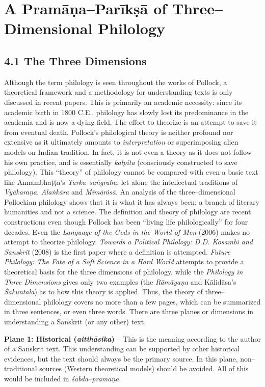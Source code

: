 
\chapter{A Pramāṇa–Parīkṣā of Three–Dimensional Philology}\label{chapter4}

\section*{4.1 The Three Dimensions}

Although the term philology is seen throughout the works of Pollock, a theoretical framework and a methodology for understanding texts is only discussed in recent papers. This is primarily an academic necessity: since its academic birth in 1800 C.E., philology has slowly lost its predominance in the academia and is now a dying field. The effort to theorize is an attempt to save it from eventual death. Pollock’s philological theory is neither profound nor extensive as it ultimately amounts to \textit{interpretation} or superimposing alien models on Indian tradition. In fact, it is not even a theory as it does not follow his own practice, and is essentially \textit{kalpita} (consciously constructed to save philology). This “theory” of philology cannot be compared with even a basic text like Annambhaṭṭa’s \textit{Tarka–saṅgraha}, let alone the intellectual traditions of \textit{Vyākaraṇa}, \textit{Alaṅkāra} and \textit{Mīmāṁsā}. An analysis of the three–dimensional Pollockian philology shows that it is what it has always been: a branch of literary humanities and not a science. The definition and theory of philology are recent constructions even though Pollock has been “living life philologically” for four decades. Even the \textit{Language of the Gods in the World of Men} (2006) makes no attempt to theorize philology. \textit{Towards a Political Philology: D.D. Kosambi and Sanskrit} (2008) is the first paper where a definition is attempted. \textit{Future Philology: The Fate of a Soft Science in a Hard World} attempts to provide a theoretical basis for the three dimensions of philology, while the \textit{Philology in Three Dimensions} gives only two examples (the \textit{Rāmāyaṇa }and Kālidāsa’s \textit{Śākuntala}) as to how this theory is applied. Thus, the theory of three–dimensional philology covers no more than a few pages, which can be summarized in three sentences, or even three words. There are three planes or dimensions in understanding a Sanskrit (or any other) text.

\textbf{Plane 1: Historical (\textit{aitihāsika})} – This is the meaning according to the author of a Sanskrit text. This understanding can be supported by other historical evidences, but the text should always be the primary source. In this plane, non–traditional sources (Western theoretical models) should be avoided. All of this would be included in \textit{śabda–pramāṇa}.

